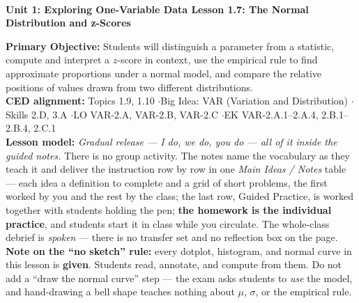 \documentclass[10pt]{article}
\newcommand{\UnitNumberName}{Unit 1: Exploring One-Variable Data \quad}
\newcommand{\LessonNumberName}{Lesson 1.7: The Normal Distribution and z-Scores}
\begin{document}
\begin{center}
    {\Large\bfseries \CourseName \\
    {\small\bfseries \UnitNumberName \LessonNumberName}}
\end{center}

\begin{tcolorbox}[colback=sky, colframe=navy, boxrule=0.9pt, arc=2mm,
    left=2mm, right=2mm, top=1.5mm, bottom=1.5mm]
    \textbf{Primary Objective:} Students will distinguish a parameter from a statistic, compute
    and interpret a $z$-score in context, use the empirical rule to find approximate proportions
    under a normal model, and compare the relative positions of values drawn from two different
    distributions.
    \\[2pt]
    \textbf{CED alignment:} Topics 1.9, 1.10 \quad$\cdot$\quad Big Idea: VAR (Variation and
    Distribution) \quad$\cdot$\quad Skills 2.D, 3.A \quad$\cdot$\quad LO VAR-2.A, VAR-2.B,
    VAR-2.C \quad$\cdot$\quad EK VAR-2.A.1--2.A.4, 2.B.1--2.B.4, 2.C.1
    \\[2pt]
    \textbf{Lesson model:} \emph{Gradual release --- I do, we do, you do --- all of it inside
    the guided notes.} There is no group activity. The notes name the vocabulary as they teach
    it and deliver the instruction row by row in one \emph{Main Ideas / Notes} table --- each
    idea a definition to complete and a grid of short problems, the first worked by you and the
    rest by the class; the last row, Guided Practice, is worked together with students holding
    the pen; \textbf{the homework is the individual practice}, and students start it in class
    while you circulate. The whole-class debrief is \emph{spoken} --- there is no transfer set
    and no reflection box on the page.
    \\[2pt]
    \textbf{Note on the ``no sketch'' rule:} every dotplot, histogram, and normal curve in this
    lesson is \textbf{given}. Students read, annotate, and compute from them. Do not add a ``draw
    the normal curve'' step --- the exam asks students to \emph{use} the model, and hand-drawing
    a bell shape teaches nothing about $\mu$, $\sigma$, or the empirical rule.
\end{tcolorbox}
\end{document}
